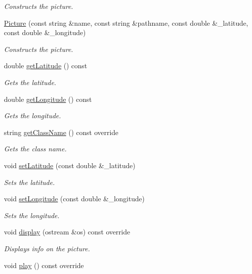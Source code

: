 \begin{DoxyCompactItemize}
\begin{DoxyCompactList}\small\item\em Constructs the picture. \end{DoxyCompactList}\item 
\hyperlink{classPicture_a5a385595e86d57a60fc3ee0deac7a434}{Picture} (const string \&name, const string \&pathname, const double \&\+\_\+latitude, const double \&\+\_\+longitude)
\begin{DoxyCompactList}\small\item\em Constructs the picture. \end{DoxyCompactList}\item 
double \hyperlink{classPicture_aa1ee860b82a140bfb1c83217d06f2cd7}{get\+Latitude} () const 
\begin{DoxyCompactList}\small\item\em Gets the latitude. \end{DoxyCompactList}\item 
double \hyperlink{classPicture_a5c26ca5c555d29735c7dfa5cdfa83286}{get\+Longitude} () const 
\begin{DoxyCompactList}\small\item\em Gets the longitude. \end{DoxyCompactList}\item 
string \hyperlink{classPicture_a91c2c1237c8bef245be245ea8aa6ef82}{get\+Class\+Name} () const override
\begin{DoxyCompactList}\small\item\em Gets the class name. \end{DoxyCompactList}\item 
void \hyperlink{classPicture_af4d86c3c40c1b6a6450a14f3f13da1a4}{set\+Latitude} (const double \&\+\_\+latitude)
\begin{DoxyCompactList}\small\item\em Sets the latitude. \end{DoxyCompactList}\item 
void \hyperlink{classPicture_a3f0d272d5df7dfcbb1cfa9a216a05134}{set\+Longitude} (const double \&\+\_\+longitude)
\begin{DoxyCompactList}\small\item\em Sets the longitude. \end{DoxyCompactList}\item 
void \hyperlink{classPicture_ac9ec4fc3fe578eeb6f22ce82ab32bc6a}{display} (ostream \&os) const override
\begin{DoxyCompactList}\small\item\em Displays info on the picture. \end{DoxyCompactList}\item 
\hypertarget{classPicture_a9c3aab87ad22bf2020c50fa3e1845e40}{}void \hyperlink{classPicture_a9c3aab87ad22bf2020c50fa3e1845e40}{play} () const override\label{classPicture_a9c3aab87ad22bf2020c50fa3e1845e40}


\end{DoxyCompactItemize}
